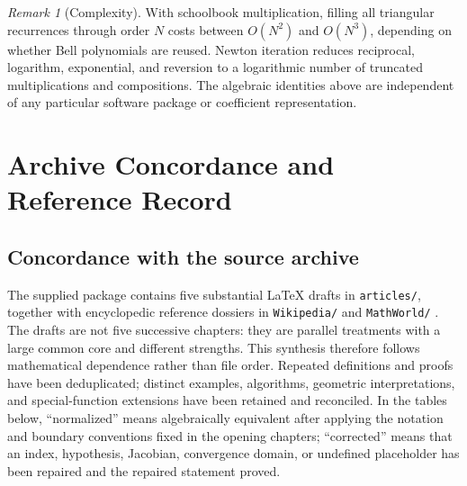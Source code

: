 \documentclass[11pt,a4paper,oneside,openany]{book}
\theoremstyle{definition}
\theoremstyle{remark}
\newtheorem{remark}[theorem]{Remark}
\begin{document}
\begin{remark}[Complexity]
With schoolbook multiplication, filling all triangular recurrences through
order \(N\) costs between \(O(N^2)\) and \(O(N^3)\), depending on whether Bell
polynomials are reused.  Newton iteration reduces reciprocal, logarithm,
exponential, and reversion to a logarithmic number of truncated multiplications
and compositions.  The algebraic identities above are independent of any
particular software package or coefficient representation.
\end{remark}


\part{Archive Concordance and Reference Record}

\chapter{Concordance with the source archive}
\label{ch:concordance}

The supplied package contains five substantial LaTeX drafts in
\nolinkurl{articles/}, together with encyclopedic reference dossiers in
\nolinkurl{Wikipedia/} and \nolinkurl{MathWorld/}
\cite{WikipediaDossier,MathWorldDossier}.  The drafts are not five successive
chapters: they are parallel treatments with a large common core and different
strengths.  This synthesis therefore follows mathematical dependence rather
than file order.  Repeated definitions and proofs have been deduplicated;
distinct examples, algorithms, geometric interpretations, and special-function
extensions have been retained and reconciled.  In the tables below,
``normalized'' means algebraically equivalent after applying the notation and
boundary conventions fixed in the opening chapters; ``corrected'' means that an
index, hypothesis, Jacobian, convergence domain, or undefined placeholder has
been repaired and the repaired statement proved.
\end{document}
